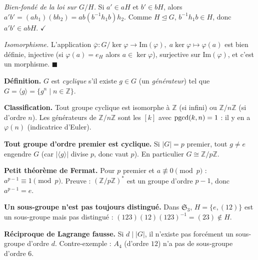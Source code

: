 \begin{mdframed}[style=proofbar]
  \textit{Bien-fondé de la loi sur $G/H$.}
  Si $a' \in aH$ et $b' \in bH$, alors $a'b' = (ah_1)(bh_2) = ab(b^{-1}h_1b)h_2$.
  Comme $H \trianglelefteq G$, $b^{-1}h_1b \in H$, donc $a'b' \in abH$. $\checkmark$

  \textit{Isomorphisme.}
  L'application $\bar\varphi : G/\ker\varphi \to \mathrm{Im}(\varphi),\; a\ker\varphi \mapsto \varphi(a)$
  est bien définie, injective (si $\varphi(a)=e_H$ alors $a\in\ker\varphi$),
  surjective sur $\mathrm{Im}(\varphi)$, et c'est un morphisme. \hfill$\blacksquare$
\end{mdframed}

\decsep{}



\begin{mdframed}[style=exbar]
  \textbf{Définition.}\enspace%
  $G$ est \emph{cyclique} s'il existe $g \in G$ (un \emph{générateur}) tel que
  $G = \langle g \rangle = \{g^n \mid n \in \mathbb{Z}\}$.

  \smallskip\noindent
  \textbf{Classification.}\enspace%
  Tout groupe cyclique est isomorphe à $\mathbb{Z}$ (si infini) ou $\mathbb{Z}/n\mathbb{Z}$
  (si d'ordre $n$). Les générateurs de $\mathbb{Z}/n\mathbb{Z}$ sont les $[k]$ avec
  $\operatorname{pgcd}(k,n)=1$ : il y en a $\varphi(n)$ (indicatrice d'Euler).

  \smallskip\noindent
  \textbf{Tout groupe d'ordre premier est cyclique.}\enspace%
  Si $|G| = p$ premier, tout $g \neq e$ engendre $G$ (car $|\langle g\rangle|$
  divise $p$, donc vaut $p$). En particulier $G \cong \mathbb{Z}/p\mathbb{Z}$.

  \smallskip\noindent
  \textbf{Petit théorème de Fermat.}\enspace%
  Pour $p$ premier et $a \not\equiv 0 \pmod{p}$ : $a^{p-1} \equiv 1 \pmod{p}$.
  Preuve : $(\mathbb{Z}/p\mathbb{Z})^*$ est un groupe d'ordre $p-1$, donc $a^{p-1}=e$.
\end{mdframed}

\vspace{6pt}

\begin{mdframed}[style=cexbar]
  \textbf{Un sous-groupe n'est pas toujours distingué.}\enspace%
  Dans $\mathfrak{S}_3$, $H = \{e, (12)\}$ est un sous-groupe mais pas distingué :
  $(123)(12){(123)}^{-1} = (23) \notin H$.

  \smallskip\noindent
  \textbf{Réciproque de Lagrange fausse.}\enspace%
  Si $d \mid |G|$, il n'existe pas forcément un sous-groupe d'ordre $d$.
  Contre-exemple : $A_4$ (d'ordre $12$) n'a pas de sous-groupe d'ordre $6$.
\end{mdframed}

